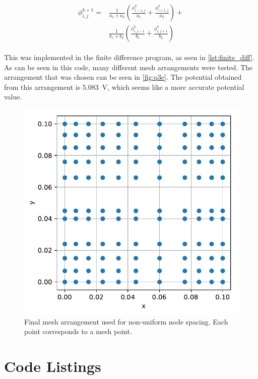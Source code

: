 \documentclass[a4paper,titlepage]{article}
\begin{document}
	\begin{align} \label{eq:non_uniform}
		\begin{split}
			\phi^{k + 1}_{i,j} = 
			&\frac{1}{a_1 + a_2}\left(\frac{\phi^k_{i - 1,j}}{a_1} + \frac{\phi^k_{i + 1,j}}{a_2}\right) + \\
			&\frac{1}{b_1 + b_2}\left(\frac{\phi^k_{i, j - 1}}{b_1} + \frac{\phi^k_{i, j + 1}}{b_2}\right)
		\end{split}
	\end{align}
	
	This was implemented in the finite difference program, as seen in \autoref{lst:finite_diff}. As can be seen in this code, many different mesh arrangements were tested. The arrangement that was chosen can be seen in \autoref{fig:q3e}. The potential obtained from this arrangement is \SI{5.083}{\volt}, which seems like a more accurate potential value.
	
	\begin{figure}[!htb]
		\centering
		\includegraphics[width=\columnwidth]{plots/q3e.pdf}
		\caption
		{Final mesh arrangement used for non-uniform node spacing. Each point corresponds to a mesh point.}
		\label{fig:q3e}
	\end{figure}
	
	\onecolumn
	
	\appendix
	
	\section{Code Listings} \label{appendix:listings}
	
\end{document}
